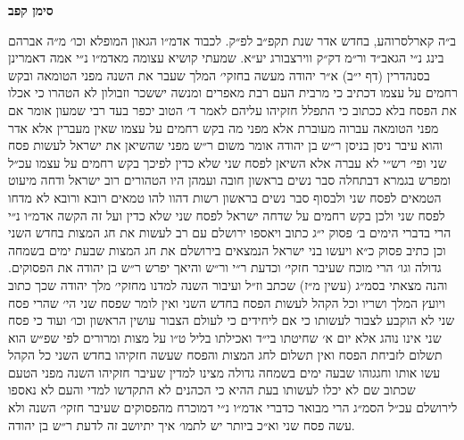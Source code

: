 \documentclass[12pt, openany]{book}
\newcommand{\chapname}{}
\newcommand{\newchap}[1]{
	\addcontentsline{toc}{chapter}{#1}
	\renewcommand{\chapname}{#1}
		\begin{center}
			\textbf{%
\fontsize{16pt}{16pt}\selectfont
				#1}
		\end{center}
}
\begin{document}
\newchap{סימן קפב}
\begin{multicols}{2}
ב״ה קארלסרוהע, בחדש אדר שנת תקפ״ב לפ״ק. לכבוד אדמ״ו הגאון המופלא וכו׳ מ״ה אברהם בינג נ״י הגאב״ד ור״מ דק״ק ווירצבורג יע״א. שמעתי קושיא עצומה מאדמ״ו נ״י אמה דאמרינן בסנהדרין (דף י״ב) א״ר יהודה מעשה בחזקי׳ המלך שעבר את השנה מפני הטומאה ובקש רחמים על עצמו דכתיב כי מרבית העם רבת מאפרים ומנשה יששכר וזבולון לא הטהרו כי אכלו את הפסח בלא ככתוב כי התפלל חזקיהו עליהם לאמר ד׳ הטוב יכפר בעד רבי שמעון אומר אם מפני הטומאה עברוה מעוברת אלא מפני מה בקש רחמים על עצמו שאין מעברין אלא אדר והוא עיבר ניסן בניסן ר״ש בן יהודה אומר משום ר״ש מפני שהשיאן את ישראל לעשות פסח שני ופי׳ רש״י לא עברה אלא השיאן לפסח שני שלא כדין לפיכך בקש רחמים על עצמו עכ״ל ומפרש בגמרא דבתחלה סבר נשים בראשון חובה ועמהן היו הטהורים רוב ישראל ודחה מיעוט הטמאים לפסח שני ולבסוף סבר נשים בראשון רשות דהוו להו טמאים רובא ורובא לא מדחו לפסח שני ולכן בקש רחמים על שדחה ישראל לפסח שני שלא כדין ועל זה הקשה אדמ״ו נ״י הרי בדברי הימים ב׳ פסוק י״ג כתוב ויאספו ירושלם עם רב לעשות את חג המצות בחדש השני וכן כתיב פסוק כ״א ויעשו בני ישראל הנמצאים בירושלם את חג המצות שבעת ימים בשמחה גדולה וגו׳ הרי מוכח שעיבר חזקי׳ וכדעת ר״י ור״ש והיאך יפרש ר״ש בן יהודה את הפסוקים. והנה מצאתי בסמ״ג (עשין מ״ז) שכתב וז״ל ועיבור השנה למדנו מחזקי׳ מלך יהודה שכך כתוב ויועץ המלך ושריו וכל הקהל לעשות הפסח בחדש השני ואין לומר שפסח שני הי׳ שהרי פסח שני לא הוקבע לצבור לעשותו כי אם ליחידים כי לעולם הצבור עושין הראשון וכו׳ ועוד כי פסח שני אינו נוהג אלא יום א׳ שחיטתו בי״ד ואכילתו בליל ט״ו על מצות ומרורים לפי שפ״ש הוא תשלום לזביחת הפסח ואין תשלום לחג המצות והפסח שעשה חזקיהו בחדש השני כל הקהל עשו אותו וחגגוהו שבעה ימים בשמחה גדולה מצינו למדין שעיבר חזקיהו השנה מפני הטעם שכתוב שם לא יכלו לעשותו בעת ההיא כי הכהנים לא התקדשו למדי והעם לא נאספו לירושלם עכ״ל הסמ״ג הרי מבואר כדברי אדמ״ו נ״י דמוכרח מהפסוקים שעיבר חזקי׳ השנה ולא עשה פסח שני וא״כ ביותר יש לתמו׳ איך יתיושב זה לדעת ר״ש בן יהודה.\\\vspace{0pt}


\end{multicols}
\end{document}
